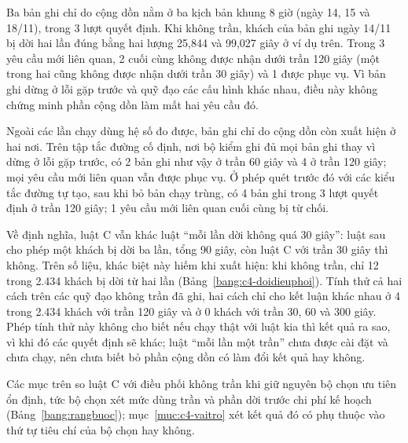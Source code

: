 Ba bản ghi chỉ do cộng dồn nằm ở ba kịch bản khung 8 giờ (ngày 14, 15 và 18/11), trong 3 lượt quyết định. Khi không
trần, khách của bản ghi ngày 14/11 bị dời hai lần đúng bằng hai lượng 25,844 và 99,027 giây ở ví dụ trên. Trong 3
yêu cầu mới liên quan, 2 cuối cùng không được nhận dưới trần 120 giây (một trong hai cũng không được nhận dưới trần
30 giây) và 1 được phục vụ. Vì bản ghi dừng ở lỗi gặp trước và quỹ đạo các cấu hình khác nhau, điều này không chứng
minh phần cộng dồn làm mất hai yêu cầu đó.

Ngoài các lần chạy dùng hệ số đo được, bản ghi chỉ do cộng dồn còn xuất hiện ở hai nơi. Trên tập tắc đường cố định,
nơi bộ kiểm ghi đủ mọi bản ghi thay vì dừng ở lỗi gặp trước, có 2 bản ghi như vậy ở trần 60 giây và 4 ở trần 120
giây; mọi yêu cầu mới liên quan vẫn được phục vụ. Ở phép quét trước đó với các kiểu tắc đường tự tạo, sau khi bỏ bản
chạy trùng, có 4 bản ghi trong 3 lượt quyết định ở trần 120 giây; 1 yêu cầu mới liên quan cuối cùng bị từ chối.

Về định nghĩa, luật C vẫn khác luật ``mỗi lần dời không quá 30 giây'': luật sau cho phép một khách bị dời ba lần,
tổng 90 giây, còn luật C với trần 30 giây thì không. Trên số liệu, khác biệt này hiếm khi xuất hiện: khi không trần,
chỉ 12 trong 2.434 khách bị dời từ hai lần (Bảng~\ref{bang:c4-doidieuphoi}). Tính thử cả hai cách trên các quỹ đạo
không trần đã ghi, hai cách chỉ cho kết luận khác nhau ở 4 trong 2.434 khách với trần 120 giây và ở 0 khách với trần
30, 60 và 300 giây. Phép tính thử này không cho biết nếu chạy thật với luật kia thì kết quả ra sao, vì khi đó các
quyết định sẽ khác; luật ``mỗi lần một trần'' chưa được cài đặt và chưa chạy, nên chưa biết bỏ phần cộng dồn có làm
đổi kết quả hay không.

Các mục trên so luật C với điều phối không trần khi giữ nguyên bộ chọn ưu tiên ổn định, tức bộ chọn xét mức dùng trần
và phần dời trước chi phí kế hoạch (Bảng~\ref{bang:rangbuoc}); mục~\ref{muc:c4-vaitro} xét kết quả đó có phụ thuộc
vào thứ tự tiêu chí của bộ chọn hay không.
